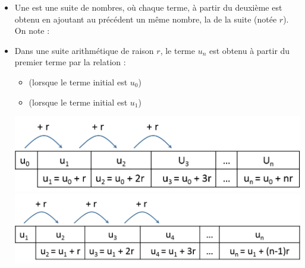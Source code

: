 \documentclass[12pt,a4paper]{article}
\begin{document}
\begin{mybilan}
	\begin{itemize}

		\item Une  est une suite de nombres, où chaque terme, à partir du deuxième est obtenu en ajoutant au précédent un même nombre, la  de la suite (notée $r$).	
		On note :
			
		\item 		Dans une suite arithmétique de raison $r$, le terme $u_n$ est obtenu à partir du premier terme par la relation :
		\begin{itemize}
			\item {} (lorsque le terme initial est $u_0$) 
			\item {} (lorsque le terme initial est $u_1$)
		\end{itemize}
	
		\begin{multicols}{2}
			\includegraphics[scale=0.4]{./img/arith1}
			\includegraphics[scale=0.4]{./img/arith2}
		\end{multicols}
	\end{itemize}
\end{mybilan}
		
	
\end{document}
